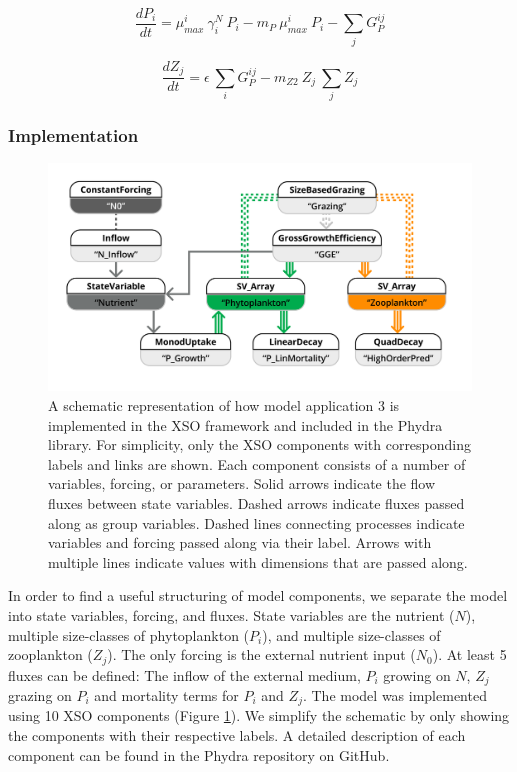 \documentclass[journal abbreviation, manuscript]{copernicus}
\begin{document}
\begin{equation}
    \frac{d P_i}{d t} =
    \mu_{max}^i \  \gamma_i^N \   P_i  %
    - m_P  \ \mu_{max}^i \ P_i %
    - \sum_{j} G_P^{ij} %
\end{equation}

\begin{equation}
    \frac{d Z_j}{d t} =
    \epsilon \ \sum_{i} G_P^{ij} %
    - m_{Z2} \ Z_j \ \sum_{j} Z_j  %
\end{equation}

\subsubsection{Implementation}
\begin{figure}[t]
\includegraphics[width=15cm]{Figures/firstdraft_schematics/code_schematics/ASTroCAT.pdf}
\caption{ A schematic representation of how model application 3 is implemented in the XSO framework and included in the Phydra library. For simplicity, only the XSO components with corresponding labels and links are shown. Each component consists of a number of variables, forcing, or parameters. Solid arrows indicate the flow fluxes between state variables. Dashed arrows indicate fluxes passed along as group variables. Dashed lines connecting processes indicate variables and forcing passed along via their label. Arrows with multiple lines indicate values with dimensions that are passed along.}
\label{Figure:CodeSchematics_3}
\end{figure}

In order to find a useful structuring of model components, we separate the model into state variables, forcing, and fluxes. State variables are the nutrient ($N$), multiple size-classes of phytoplankton ($P_i$), and multiple size-classes of zooplankton ($Z_j$). The only forcing is the external nutrient input ($N_0$). At least 5 fluxes can be defined: The inflow of the external medium, $P_i$ growing on $N$, $Z_j$ grazing on $P_i$ and mortality terms for $P_i$ and $Z_j$.
The model was implemented using 10 XSO components (Figure \ref{Figure:CodeSchematics_3}). We simplify the schematic by only showing the components with their respective labels. A detailed description of each component can be found in the Phydra repository on GitHub.
\end{document}
